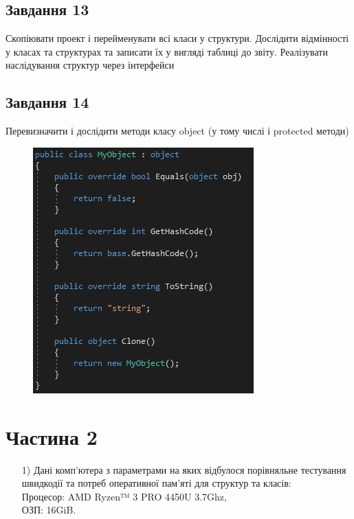 \documentclass[oneside,14pt]{extarticle}
\begin{document}
\begin{normalsize}
	\subsection*{Завдання 13}
	Скопіювати проект і перейменувати всі класи у структури. Дослідити відмінності у
	класах та структурах та записати їх у вигляді таблиці до звіту. Реалізувати
	наслідування структур через інтерфейси
	
	\subsection*{Завдання 14}
	Перевизначити і дослідити методи класу object (у тому числі і protected методи)
	\begin{figure}[H]
		\centering
		\includegraphics[scale=0.7]{114}
	\end{figure}
	
	\section*{Частина 2}
	\begin{enumerate}
		\item[1)] Дані комп'ютера з параметрами на яких відбулося порівняльне тестування швидкодії та потреб оперативної пам'яті для структур та класів:\\
		Процесор: AMD Ryzen™ 3 PRO 4450U 3.7Ghz, \\ОЗП: 16GiB.
		

\end{enumerate}
\end{normalsize}
\end{document}

